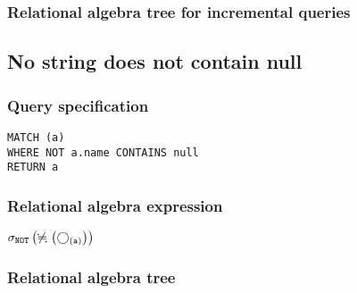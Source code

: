 \subsubsection*{Relational algebra tree for incremental queries}


\subsection{No string does not contain null}

\subsubsection*{Query specification}

\begin{lstlisting}
MATCH (a)
WHERE NOT a.name CONTAINS null
RETURN a
\end{lstlisting}

\subsubsection*{Relational algebra expression}

$\selection{\mathtt{NOT}} \left(\alldifferent{} \left(\getvertices{a}{}\right)\right)$

\subsubsection*{Relational algebra tree}


